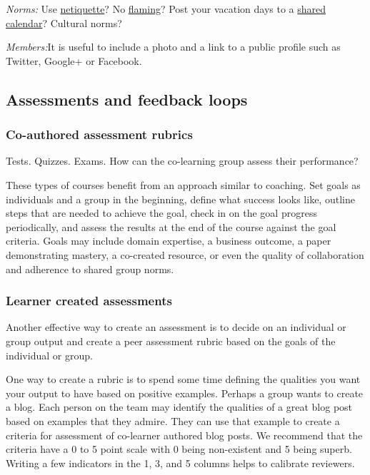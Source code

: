 \emph{Norms:} Use
\href{http://en.wikipedia.org/wiki/Netiquette\#Netiquette}{netiquette}?
No
\href{http://en.wikipedia.org/wiki/Flaming\_\%28Internet\%29}{flaming}?
Post your vacation days to a
\href{http://support.google.com/calendar/bin/answer.py?hl=en\&answer=36598}{shared
calendar}? Cultural norms?

\emph{Members:}It is useful to include a photo and a link to a public
profile such as Twitter, Google+ or Facebook.

\subsection{Assessments and feedback loops}

\subsubsection{Co-authored assessment rubrics}

Tests. Quizzes. Exams. How can the co-learning group assess their
performance?

These types of courses benefit from an approach similar to coaching. Set
goals as individuals and a group in the beginning, define what success
looks like, outline steps that are needed to achieve the goal, check in
on the goal progress periodically, and assess the results at the end of
the course against the goal criteria. Goals may include domain
expertise, a business outcome, a paper demonstrating mastery, a
co-created resource, or even the quality of collaboration and adherence
to shared group norms.

\subsubsection{Learner created assessments}

Another effective way to create an assessment is to decide on an
individual or group output and create a peer assessment rubric based on
the goals of the individual or group.

One way to create a rubric is to spend some time defining the qualities
you want your output to have based on positive examples. Perhaps a group
wants to create a blog. Each person on the team may identify the
qualities of a great blog post based on examples that they admire. They
can use that example to create a criteria for assessment of co-learner
authored blog posts. We recommend that the criteria have a 0 to 5 point
scale with 0 being non-existent and 5 being superb. Writing a few
indicators in the 1, 3, and 5 columns helps to calibrate reviewers.

